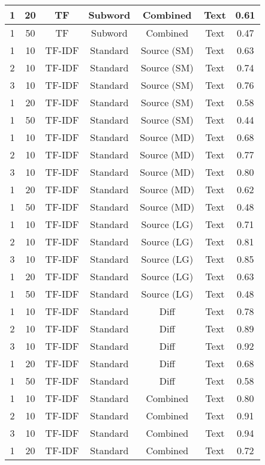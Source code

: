 \begin{longtable}{|c|c|c|c|c|c|c|}
\hline
1 & 20 & TF & Subword & Combined & Text & 0.61 \\
\hline
1 & 50 & TF & Subword & Combined & Text & 0.47 \\
\hline
1 & 10 & TF-IDF & Standard & Source (SM) & Text & 0.63 \\
\hline
2 & 10 & TF-IDF & Standard & Source (SM) & Text & 0.74 \\
\hline
3 & 10 & TF-IDF & Standard & Source (SM) & Text & 0.76 \\
\hline
1 & 20 & TF-IDF & Standard & Source (SM) & Text & 0.58 \\
\hline
1 & 50 & TF-IDF & Standard & Source (SM) & Text & 0.44 \\
\hline
1 & 10 & TF-IDF & Standard & Source (MD) & Text & 0.68 \\
\hline
2 & 10 & TF-IDF & Standard & Source (MD) & Text & 0.77 \\
\hline
3 & 10 & TF-IDF & Standard & Source (MD) & Text & 0.80 \\
\hline
1 & 20 & TF-IDF & Standard & Source (MD) & Text & 0.62 \\
\hline
1 & 50 & TF-IDF & Standard & Source (MD) & Text & 0.48 \\
\hline
1 & 10 & TF-IDF & Standard & Source (LG) & Text & 0.71 \\
\hline
2 & 10 & TF-IDF & Standard & Source (LG) & Text & 0.81 \\
\hline
3 & 10 & TF-IDF & Standard & Source (LG) & Text & 0.85 \\
\hline
1 & 20 & TF-IDF & Standard & Source (LG) & Text & 0.63 \\
\hline
1 & 50 & TF-IDF & Standard & Source (LG) & Text & 0.48 \\
\hline
1 & 10 & TF-IDF & Standard & Diff & Text & 0.78 \\
\hline
2 & 10 & TF-IDF & Standard & Diff & Text & 0.89 \\
\hline
3 & 10 & TF-IDF & Standard & Diff & Text & 0.92 \\
\hline
1 & 20 & TF-IDF & Standard & Diff & Text & 0.68 \\
\hline
1 & 50 & TF-IDF & Standard & Diff & Text & 0.58 \\
\hline
1 & 10 & TF-IDF & Standard & Combined & Text & 0.80 \\
\hline
2 & 10 & TF-IDF & Standard & Combined & Text & 0.91 \\
\hline
3 & 10 & TF-IDF & Standard & Combined & Text & 0.94 \\
\hline
1 & 20 & TF-IDF & Standard & Combined & Text & 0.72 \\

\end{longtable}
